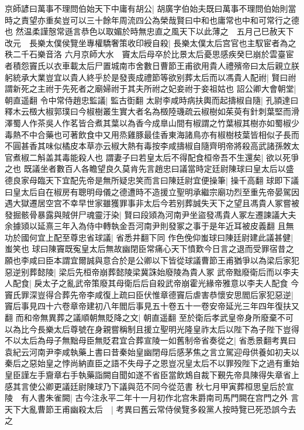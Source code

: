 京師諺曰萬事不理問伯始天下中庸有胡公|{
	胡廣字伯始夫既曰萬事不理問伯始則當時之責望亦重矣豈可以三十餘年周流四公為榮哉賢曰中和也庸常也中和可常行之德也}
然温柔謹慤常遜言恭色以取媚於時無忠直之風天下以此薄之　五月己巳赦天下改元　長樂太僕侯覽坐專權驕奢策收印綬自殺|{
	長樂太僕太后宫官也主馭宦者為之秩二千石樂音洛}
六月京師大水　竇太后母卒於比景太后憂思感疾癸巳崩於雲臺宦者積怨竇氏以衣車載太后尸置城南市舍數日曹節王甫欲用貴人禮殯帝曰太后親立朕躬統承大業豈宜以貴人終乎於是發喪成禮節等欲别葬太后而以馮貴人配祔|{
	賢曰祔謂新死之主祔于先死者之廟婦祔于其夫所祔之妃妾祔于妾祖姑也}
詔公卿大會朝堂|{
	朝直遥翻}
令中常侍趙忠監議|{
	監古衘翻}
太尉李咸時病扶輿而起擣椒自隨|{
	孔頴達曰釋木云檓大椒郭璞曰今椒樹叢生實大者名為檓陸璣疏云椒樹如茱萸有針刺葉堅而滑澤蜀人作茶吳人作茗皆合煮其葉以為香今成臯山間有椒謂之竹葉椒其樹亦如蜀椒少毒熱不中合藥也可著飲食中又用烝雞豚最佳香東海諸鳥亦有椒樹枝葉皆相似子長而不圓甚香其味似橘皮本草亦云椒大熱有毒按李咸擣椒自隨齊明帝將殺高武諸孫敇太官煮椒二斛盖其毒能殺人也}
謂妻子曰若皇太后不得配食桓帝吾不生還矣|{
	欲以死爭之也}
既議坐者數百人各瞻望良久莫肯先言趙忠曰議當時定廷尉陳球曰皇太后以盛德良家母臨天下宜配先帝是無所疑忠笑而言曰陳廷尉宜便操筆|{
	操千高翻}
球即下議曰皇太后自在椒房有聰明母儀之德遭時不造援立聖明承繼宗廟功烈至重先帝晏駕因遇大獄遷居空宫不幸早世家雖獲罪事非太后今若别葬誠失天下之望且馮貴人冢嘗被發掘骸骨暴露與賊併尸魂靈汙染|{
	賢曰段熲為河南尹坐盜發馮貴人冢左遷諫議大夫余據熲以延熹三年入為侍中轉執金吾河南尹則發冢之事于是年近耳被皮義翻}
且無功於國何宜上配至尊忠省球議|{
	省悉井翻下同}
作色俛仰蚩球曰陳廷尉建此議甚健|{
	蚩笑也}
球曰陳竇既寃皇太后無故幽閉臣常痛心天下憤歎今日言之退而受罪宿昔之願也李咸曰臣本謂宜爾誠與意合於是公卿以下皆從球議曹節王甫猶爭以為梁后家犯惡逆别葬懿陵|{
	梁后先桓帝崩葬懿陵梁冀誅始廢陵為貴人冢}
武帝黜廢衛后而以李夫人配食|{
	戾太子之亂武帝策廢其母衛后后自殺武帝崩霍光緣帝雅意以李夫人配食}
今竇氏罪深豈得合葬先帝李咸復上疏曰臣伏惟章德竇后虐害恭懷安思閻后家犯惡逆|{
	竇后事見四十六卷章帝建初八年閻后事見五十卷五十一卷安帝延光三年四年復扶又翻}
而和帝無異葬之議順朝無貶降之文|{
	朝直遥翻}
至於衛后孝武皇帝身所廢棄不可以為比今長樂太后尊號在身親嘗稱制且援立聖明光隆皇祚太后以陛下為子陛下豈得不以太后為母子無黜母臣無貶君宜合葬宣陵一如舊制帝省奏從之|{
	省悉景翻考異曰袁紀云河南尹李咸執藥上書曰昔秦始皇幽閉母后感茅焦之言立駕迎母供養如初夫以秦后之惡始皇之悖尚納直臣之語不失母子之恩豈况皇太后不以罪殁陛下之過有重始皇臣謹左手齎章右手執藥詣闕自聞如遂不省臣當飲鴆自裁下覲先帝具陳得失章省上感其言使公卿更議廷尉陳球乃下議與范不同今從范書}
秋七月甲寅葬桓思皇后於宣陵　有人書朱雀闕|{
	古今注永平二年十一月初作北宫朱爵南司馬門闕在宫門之外}
言天下大亂曹節王甫幽殺太后　|{
	考異曰舊云常侍侯覽多殺黨人按時覽已死恐誤今去之}
